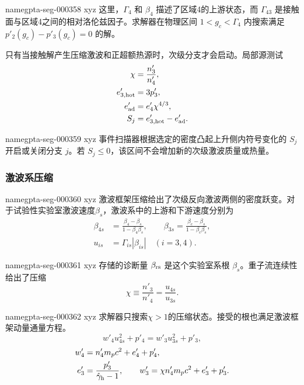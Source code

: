 \documentclass[twocolumn]{aastex702}
\makeatletter
\providecommand{\gptareaderanchor}[1]{\pdfdest name{#1} xyz}%
\providecommand{\gptareaderanchor}[1]{\special{pdf:dest (#1) [ @thispage /XYZ @xpos @ypos null ]}}%
\makeatother
\begin{document}
\gptareaderanchor{gpta-seg-000358}%
这里，\(\Gamma_4\) 和 \(\beta_4\) 描述了区域4的上游状态，而 \(\Gamma_{43}\) 是接触面与区域4之间的相对洛伦兹因子。求解器在物理区间 \(1<g_c<\Gamma_4\) 内搜索满足 \(p'_2(g_c)-p'_3(g_c)=0\) 的解。

只有当接触解产生压缩激波和正超额热源时，次级分支才会启动。局部源测试
\begin{equation}
\begin{aligned}
\chi&=\frac{n'_3}{n'_4},\\
e'_{3,{\rm hot}}&=3p'_3,\\
e'_{\rm ad}&=e'_4\chi^{4/3},\\
S_j&=e'_{3,{\rm hot}}-e'_{\rm ad}.
\end{aligned}
\end{equation}

\gptareaderanchor{gpta-seg-000359}%
事件扫描器根据选定的密度凸起上升侧内符号变化的 \(S_j\) 开启或关闭分支 \(j\)。若 \(S_j\le0\)，该区间不会增加新的次级激波质量或热量。

\subsubsection{激波系压缩}


\gptareaderanchor{gpta-seg-000360}%
激波框架压缩给出了次级反向激波两侧的密度跃变。对于试验性实验室激波速度\(\beta_s\)，激波系中的上游和下游速度分别为
\begin{equation}
\begin{aligned}
\beta_{4s}&=\frac{\beta_4-\beta_s}{1-\beta_4\beta_s},
\qquad
\beta_{3s}=\frac{\beta_c-\beta_s}{1-\beta_c\beta_s},\\
u_{is}&=\Gamma_{is}|\beta_{is}|\quad (i=3,4).
\end{aligned}
\end{equation}

\gptareaderanchor{gpta-seg-000361}%
存储的诊断量 \(\beta_{\rm rs}\) 是这个实验室系根 \(\beta_s\)。重子流连续性给出了压缩
\begin{equation}
\chi\equiv\frac{n'_3}{n'_4}=\frac{u_{4s}}{u_{3s}} .
\end{equation}

\gptareaderanchor{gpta-seg-000362}%
求解器只搜索\(\chi>1\)的压缩状态。接受的根也满足激波框架动量通量方程。
\begin{equation}
w'_4u_{4s}^2+p'_4=w'_3u_{3s}^2+p'_3,
\end{equation}
\begin{equation}
\begin{aligned}
w'_4&=n'_4m_pc^2+e'_4+p'_4,\\
e'_3&=\frac{p'_3}{\hat\gamma_{\rm h}-1},
\qquad
w'_3=\chi n'_4m_pc^2+e'_3+p'_3 .
\end{aligned}
\end{equation}
\end{document}
